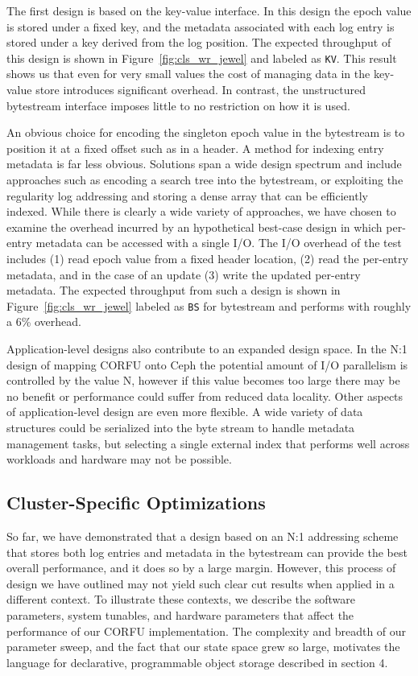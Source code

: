 \documentclass[10pt,twocolumn]{article}
\begin{document}
The first design is based on the key-value interface. In this design the epoch
value is stored under a fixed key, and the metadata associated with each log
entry is stored under a key derived from the log position. The expected
throughput of this design is shown in Figure~\ref{fig:cls_wr_jewel} and labeled
as \texttt{KV}. This result shows us that even for very small values the cost
of managing data in the key-value store introduces significant overhead. In
contrast, the unstructured bytestream interface imposes little to no
restriction on how it is used.

An obvious choice for encoding the singleton epoch value in the bytestream is
to position it at a fixed offset such as in a header. A method for indexing
entry metadata is far less obvious. Solutions span a wide design spectrum and
include approaches such as encoding a search tree into the bytestream, or
exploiting the regularity log addressing and storing a dense array that can be
efficiently indexed. While there is clearly a wide variety of approaches, we
have chosen to examine the overhead incurred by an hypothetical best-case
design in which per-entry metadata can be accessed with a single I/O. The I/O
overhead of the test includes (1) read epoch value from a fixed header
location, (2) read the per-entry metadata, and in the case of an update (3)
write the updated per-entry metadata. The expected throughput from such a
design is shown in Figure~\ref{fig:cls_wr_jewel} labeled as \texttt{BS} for
bytestream and performs with roughly a 6\% overhead.

Application-level designs also contribute to an expanded design space.  In the
N:1 design of mapping CORFU onto Ceph the potential amount of I/O parallelism
is controlled by the value N, however if this value becomes too large there may
be no benefit or performance could suffer from reduced data locality. Other
aspects of application-level design are even more flexible. A wide variety of
data structures could be serialized into the byte stream to handle metadata
management tasks, but selecting a single external index that performs well
across workloads and hardware may not be possible.

\subsection{Cluster-Specific Optimizations}

So far, we have demonstrated that a design based on an N:1 addressing scheme
that stores both log entries and metadata in the bytestream can provide the
best overall performance, and it does so by a large margin. However, this
process of design we have outlined may not yield such clear cut results when
applied in a different context. To illustrate these contexts, we describe the
software parameters, system tunables, and hardware parameters that affect the
performance of our CORFU implementation. The complexity and breadth of our
parameter sweep, and the fact that our state space grew so large, motivates the
language for declarative, programmable object storage described in section 4.
\end{document}
